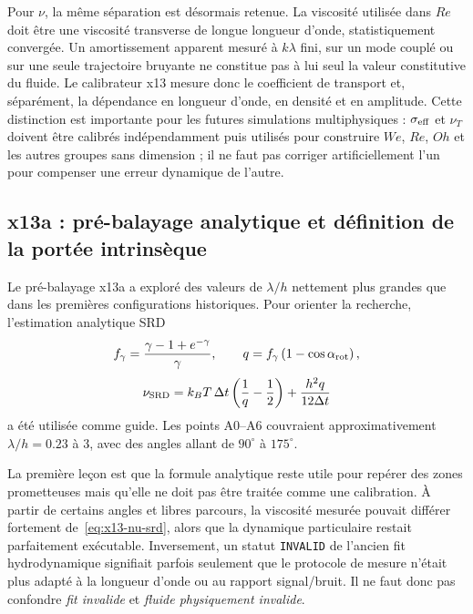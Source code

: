 \documentclass[11pt,a4paper]{article}
\begin{document}
Pour $\nu$, la même séparation est désormais retenue. La viscosité utilisée dans $Re$ doit être une viscosité transverse de longue longueur d'onde, statistiquement convergée. Un amortissement apparent mesuré à $k\lambda$ fini, sur un mode couplé ou sur une seule trajectoire bruyante ne constitue pas à lui seul la valeur constitutive du fluide. Le calibrateur x13 mesure donc le coefficient de transport et, séparément, la dépendance en longueur d'onde, en densité et en amplitude. Cette distinction est importante pour les futures simulations multiphysiques : $\sigma_{\rm eff}$ et $\nu_T$ doivent être calibrés indépendamment puis utilisés pour construire $We$, $Re$, $Oh$ et les autres groupes sans dimension ; il ne faut pas corriger artificiellement l'un pour compenser une erreur dynamique de l'autre.

\subsection{x13a : pré-balayage analytique et définition de la portée intrinsèque}

Le pré-balayage x13a a exploré des valeurs de $\lambda/h$ nettement plus grandes que dans les premières configurations historiques. Pour orienter la recherche, l'estimation analytique SRD
\begin{equation}
  f_\gamma=\frac{\gamma-1+e^{-\gamma}}{\gamma},
  \qquad
  q=f_\gamma\left(1-\cos\alpha_{\rm rot}\right),
\end{equation}
\begin{equation}
  \nu_{\rm SRD}
  =
  k_BT\,\Delta t\left(\frac{1}{q}-\frac12\right)
  +
  \frac{h^2q}{12\Delta t}
  \label{eq:x13-nu-srd}
\end{equation}
a été utilisée comme guide. Les points A0--A6 couvraient approximativement $\lambda/h=0.23$ à 3, avec des angles allant de $90^\circ$ à $175^\circ$.

La première leçon est que la formule analytique reste utile pour repérer des zones prometteuses mais qu'elle ne doit pas être traitée comme une calibration. À partir de certains angles et libres parcours, la viscosité mesurée pouvait différer fortement de~\eqref{eq:x13-nu-srd}, alors que la dynamique particulaire restait parfaitement exécutable. Inversement, un statut \texttt{INVALID} de l'ancien fit hydrodynamique signifiait parfois seulement que le protocole de mesure n'était plus adapté à la longueur d'onde ou au rapport signal/bruit. Il ne faut donc pas confondre \emph{fit invalide} et \emph{fluide physiquement invalide}.
\end{document}
